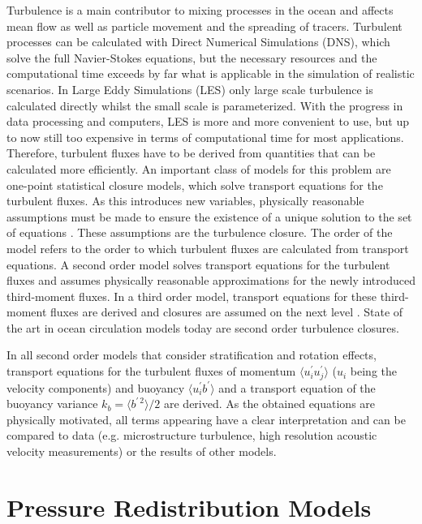 Turbulence is a main contributor to mixing processes in the ocean and affects 
mean flow as well as particle movement and the spreading of tracers. Turbulent 
processes can be calculated with Direct Numerical Simulations (DNS), which solve 
the full Navier-Stokes equations, but the necessary resources and the 
computational time exceeds by far what is applicable in the simulation of 
realistic scenarios. In Large Eddy Simulations (LES) only large scale turbulence 
is calculated directly whilst the small scale is parameterized. With the 
progress in data processing and computers, LES is more and more convenient to 
use, but up to now still too expensive in terms of computational time for most 
applications. Therefore, turbulent fluxes have to be derived from quantities 
that can be calculated more efficiently. An important class of models for this 
problem are one-point statistical closure models, which solve transport 
equations for the turbulent fluxes. As this introduces new variables, physically 
reasonable assumptions must be made to ensure the existence of a unique solution 
to the set of equations \citep[][]{UmlaufBurchard2005a}. These assumptions are 
the turbulence closure. The order of the model refers to the order to which 
turbulent fluxes are calculated from transport equations. A second order model 
solves transport equations for the turbulent fluxes and assumes physically 
reasonable approximations for the newly introduced third-moment fluxes. In a 
third order model, transport equations for these third-moment fluxes are derived 
and closures are assumed on the next level \citep[e.g. in][]{sander1998}. State 
of the art in ocean circulation models today are second order turbulence 
closures. 

In all second order models that consider stratification and rotation effects, 
transport equations for the turbulent fluxes of momentum $\langle u_i^\prime 
u_j^\prime \rangle$ ($u_i$ being the velocity components) and buoyancy $\langle 
u_i^\prime b^\prime \rangle$ and a transport equation of the buoyancy variance 
$k_b = \langle b^{\prime \, 2} \rangle \slash 2 $ are derived. As the obtained 
equations are physically motivated, all terms appearing have a clear 
interpretation and can be compared to data (e.g. microstructure turbulence, high 
resolution acoustic velocity measurements) or the results of other models.  

\section{Pressure Redistribution Models}\label{pressresm}

